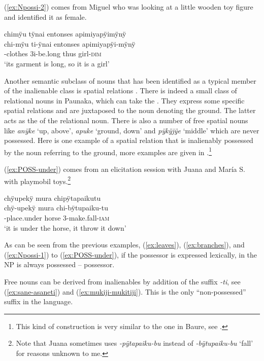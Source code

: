 (\ref{ex:Npossi-2}) comes from Miguel who was looking at a little wooden toy figure and identified it as female.

\ea\label{ex:Npossi-2}
\begingl
\glpreamble chimÿu tÿnai entonses apimiyapÿimÿnÿ\\
\gla chi-mÿu ti-ÿnai entonses apimiyapÿi-mÿnÿ\\
-clothes 3i-be.long thus girl-\textsc{dim}\\
\glft ‘its garment is long, so it is a girl’
\endgl
\trailingcitation{[mox-e110914l-1.049]}
\xe

Another semantic subclass of nouns that has been identified as a typical member of the inalienable class is spatial relations \citep[cf.][572]{Nichols1988}. There is indeed a small class of relational nouns in Paunaka, which can take the . They express some specific spatial relations and are juxtaposed to the noun denoting the ground. The latter acts as the  of the relational noun. There is also a number of free spatial nouns like \textit{anÿke} ‘up, above’, \textit{apuke} ‘ground, down’ and \textit{pÿkÿjÿe} ‘middle’ which are never possessed. Here is one example of a spatial relation that is inalienably possessed by the noun referring to the ground, more examples are given in .\footnote{This kind of construction is very similar to the one in Baure, see \citet[72--74]{Admiraal2016}.}

(\ref{ex:POSS-under}) comes from an elicitation session with Juana and María S. with playmobil toys.\footnote{Note that Juana sometimes uses \textit{-pÿtapaiku-bu} instead of \textit{-bÿtupaiku-bu} ‘fall’ for reasons unknown to me.}

\ea\label{ex:POSS-under}
\begingl
\glpreamble chÿupekÿ mura chipÿtapaikutu\\
\gla chÿ-upekÿ mura chi-bÿtupaiku-tu\\
-place.under horse 3-make.fall-\textsc{iam}\\
\glft ‘it is under the horse, it throw it down’
\endgl
{}
\xe
{}

As can be seen from the previous examples, (\ref{ex:leaves}), (\ref{ex:branches}), and (\ref{ex:Npossi-1}) to (\ref{ex:POSS-under}), if the possessor is expressed lexically,  in the NP is always possessed – possessor.

Free nouns can be derived from inalienables by addition of the suffix \textit{-ti}, see (\ref{ex:sane-asaneti}) and (\ref{ex:mukiji-mukitiji}). This is the only “non-possessed” suffix in the language.


